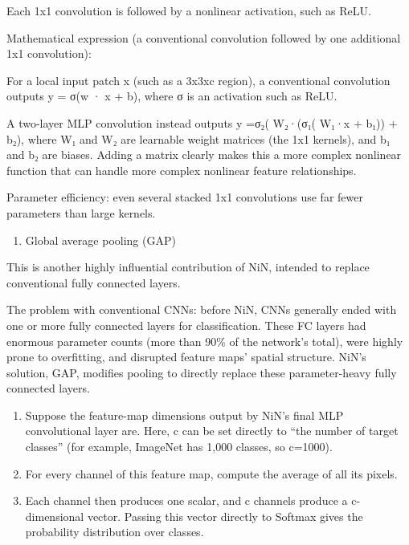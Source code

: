 Each 1x1 convolution is followed by a nonlinear activation, such as ReLU.

Mathematical expression (a conventional convolution followed by one additional 1x1 convolution):

For a local input patch x (such as a 3x3xc region), a conventional convolution outputs y = σ(w · x + b), where σ is an activation such as ReLU.

A two-layer MLP convolution instead outputs y =σ₂( W₂·(σ₁( W₁·x + b₁)) + b₂), where W₁ and W₂ are learnable weight matrices (the 1x1 kernels), and b₁ and b₂ are biases. Adding a matrix clearly makes this a more complex nonlinear function that can handle more complex nonlinear feature relationships.

Parameter efficiency: even several stacked 1x1 convolutions use far fewer parameters than large kernels.

\begin{enumerate}
\def\labelenumi{\arabic{enumi}.}
\setcounter{enumi}{1}
\tightlist
\item
  Global average pooling (GAP)
\end{enumerate}

This is another highly influential contribution of NiN, intended to replace conventional fully connected layers.

The problem with conventional CNNs: before NiN, CNNs generally ended with one or more fully connected layers for classification. These FC layers had enormous parameter counts (more than 90\% of the network's total), were highly prone to overfitting, and disrupted feature maps' spatial structure. NiN's solution, GAP, modifies pooling to directly replace these parameter-heavy fully connected layers.

\begin{enumerate}
\def\labelenumi{(\arabic{enumi})}
\item
  Suppose the feature-map dimensions output by NiN's final MLP convolutional layer are. Here, c can be set directly to ``the number of target classes'' (for example, ImageNet has 1,000 classes, so c=1000).
\item
  For every channel of this feature map, compute the average of all its pixels.
\item
  Each channel then produces one scalar, and c channels produce a c-dimensional vector. Passing this vector directly to Softmax gives the probability distribution over classes.
\end{enumerate}

